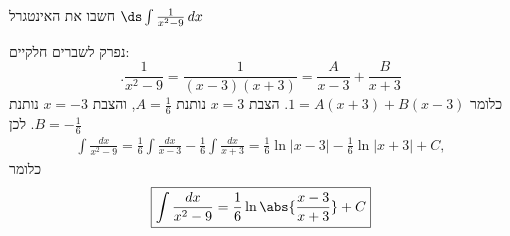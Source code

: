 חשבו את האינטגרל
$\ds \int\frac{1}{x^2 - 9} \, dx$
\begin{solbox}
\unverified
נפרק לשברים חלקיים:
$$.\frac{1}{x^2-9}=\frac{1}{(x-3)(x+3)}=\frac{A}{x-3}+\frac{B}{x+3}$$
כלומר
$1=A(x+3)+B(x-3)$.
הצבת
$x=3$
נותנת
$A=\frac16$,
והצבת
$x=-3$
נותנת
$B=-\frac16$.
לכן
\begin{align*}
\int\frac{dx}{x^2-9}=\frac16\int\frac{dx}{x-3}-\frac16\int\frac{dx}{x+3}=\frac16\ln|x-3|-\frac16\ln|x+3|+C,
\end{align*}
כלומר
\begin{align*}
\boxed{\int\frac{dx}{x^2-9}=\frac16\ln\abs{\frac{x-3}{x+3}}+C}
\end{align*}
\end{solbox}
